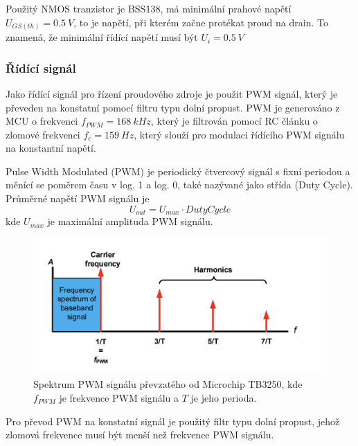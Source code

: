 Použitý NMOS tranzistor je BSS138, má minimální prahové napětí $U_{GS(th)} = 0.5 \ V$, to je napětí, při kterém začne protékat proud na drain. To znamená, že minimální řídící napětí musí být $U_{i} = 0.5 \ V$


\subsubsection{Řídící signál}
Jako řídící signál pro řízení proudového zdroje je použit PWM signál, který je převeden na konstatní pomocí filtru typu dolní propust. PWM je generováno z MCU o frekvenci $f_{PWM} = 168 \ kHz$, který je filtrován pomocí RC článku o zlomové frekvenci $f_c = 159 \ Hz$, který slouží pro modulaci řídícího PWM signálu na konstantní napětí.
\par
Pulse Width Modulated (PWM) je periodický čtvercový signál s fixní periodou a měnící se poměrem času v log. 1 a log. 0, také nazývané jako střída (Duty Cycle). Průměrné napětí PWM signálu je
\begin{equation}
    U_{out} = U_{max} \cdot Duty Cycle
\end{equation}
kde $U_{max}$ je maximální amplituda PWM signálu. \par
\begin{figure}[H]
    \centering
    \includegraphics[width=1\linewidth]{pictures/pwm_spectrum_microchip90003250A.jpg}
    \caption{Spektrum PWM signálu převzatého od Microchip TB3250, kde $f_{PWM}$ je frekvence PWM signálu a $T$ je jeho perioda. \cite{cite:MCPPWV}}
    \label{fig:pwm_spectrum}
\end{figure}

Pro převod PWM na konstatní signál je použitý filtr typu dolní propust, jehož zlomová frekvence musí být menší než frekvence PWM signálu.



